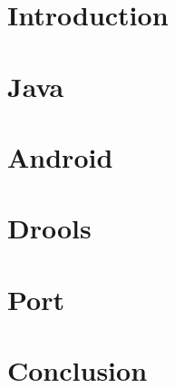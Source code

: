 \chapter{Introduction}


\chapter{Java}


\chapter{Android}


\chapter{Drools}


\chapter{Port}


\chapter{Conclusion}


